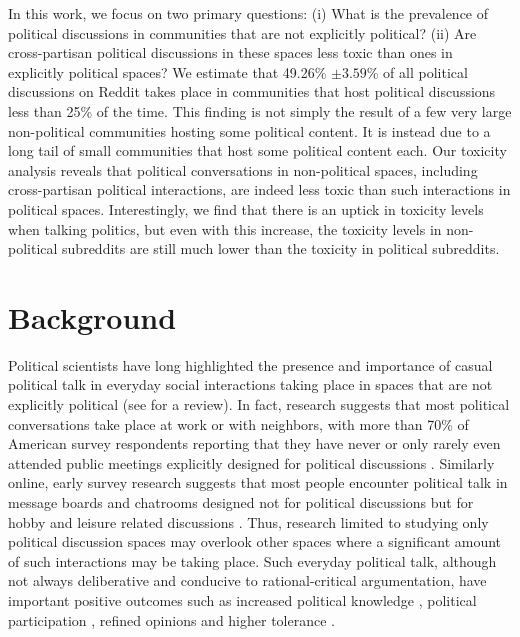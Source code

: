 \documentclass[letterpaper]{article} %
\begin{document}
In this work, we focus on two primary questions: (i) What is the prevalence of political discussions in communities that are not explicitly political? (ii) Are cross-partisan political discussions in these spaces less toxic than ones in explicitly political spaces? We estimate that 49.26\% $\pm 3.59$\%  of all political discussions on Reddit takes place in communities that host political discussions less than 25\% of the time. This finding is not simply the result of a few very large non-political communities hosting some political content. It is instead due to a long tail of small communities that host some political content each. 
Our toxicity analysis reveals that political conversations in non-political spaces, including cross-partisan political interactions, are indeed less toxic than such interactions in political spaces. Interestingly, we find that there is an uptick in toxicity levels when talking politics, but even with this increase, the toxicity levels in non-political subreddits are still much lower than the toxicity in political subreddits.


\section{Background}

Political scientists have long highlighted the presence and importance of casual political talk in everyday social interactions taking place in spaces that are not explicitly political (see \cite{conover2018taking} for a review). In fact, research suggests that most political conversations take place at work or with neighbors, with more than 70\% of American survey respondents reporting that they have never or only rarely even attended public meetings explicitly designed for political discussions \cite{conover2002deliberative}. Similarly online, early survey research suggests that most people encounter political talk in message boards and chatrooms designed not for political discussions but for hobby and leisure related discussions \cite{wojcieszak2009online}. Thus, research limited to studying only political discussion spaces may overlook other spaces where a significant amount of such interactions may be taking place. Such everyday political talk, although not always deliberative and conducive to rational-critical argumentation, have important positive outcomes such as increased political knowledge \cite{pattie2008s}, political participation \cite{searing2007public}, refined opinions \cite{kim2008theorizing} and higher tolerance \cite{pattie2008s,mutz2006hearing}. 
\end{document}
